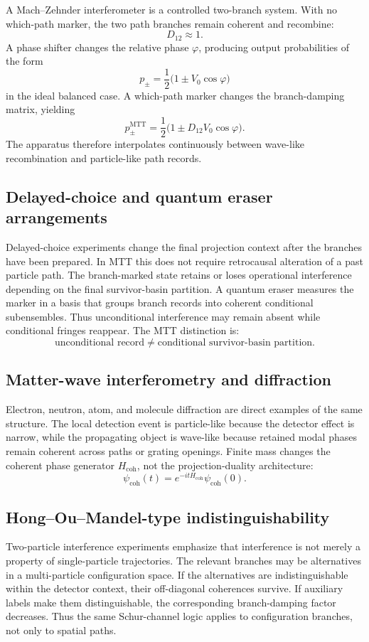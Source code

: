 \documentclass[11pt]{article}
\newcommand{\coh}{\mathrm{coh}}
\newcommand{\MTT}{\mathrm{MTT}}
\begin{document}
A Mach--Zehnder interferometer is a controlled two-branch system. With no which-path marker,
the two path branches remain coherent and recombine:
\[
  D_{12}\approx1.
\]
A phase shifter changes the relative phase \(\varphi\), producing output probabilities of the
form
\[
  p_{\pm}=\frac12\bigl(1\pm V_0\cos\varphi\bigr)
\]
in the ideal balanced case. A which-path marker changes the branch-damping matrix, yielding
\[
  p_{\pm}^{\MTT}
  =
  \frac12\bigl(1\pm D_{12}V_0\cos\varphi\bigr).
\]
The apparatus therefore interpolates continuously between wave-like recombination and
particle-like path records.

\subsection{Delayed-choice and quantum eraser arrangements}

Delayed-choice experiments change the final projection context after the branches have been
prepared. In MTT this does not require retrocausal alteration of a past particle path. The
branch-marked state retains or loses operational interference depending on the final
survivor-basin partition. A quantum eraser measures the marker in a basis that groups branch
records into coherent conditional subensembles. Thus unconditional interference may remain
absent while conditional fringes reappear. The MTT distinction is:
\[
  \text{unconditional record}
  \neq
  \text{conditional survivor-basin partition}.
\]

\subsection{Matter-wave interferometry and diffraction}

Electron, neutron, atom, and molecule diffraction are direct examples of the same structure.
The local detection event is particle-like because the detector effect is narrow, while the
propagating object is wave-like because retained modal phases remain coherent across paths or
grating openings. Finite mass changes the coherent phase generator \(H_{\coh}\), not the
projection-duality architecture:
\[
  \psi_{\coh}(t)=e^{-itH_{\coh}}\psi_{\coh}(0).
\]

\subsection{Hong--Ou--Mandel-type indistinguishability}

Two-particle interference experiments emphasize that interference is not merely a property of
single-particle trajectories. The relevant branches may be alternatives in a multi-particle
configuration space. If the alternatives are indistinguishable within the detector context, their
off-diagonal coherences survive. If auxiliary labels make them distinguishable, the corresponding
branch-damping factor decreases. Thus the same Schur-channel logic applies to configuration
branches, not only to spatial paths.
\end{document}
